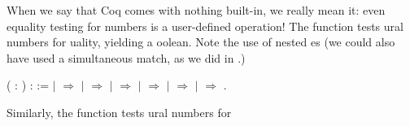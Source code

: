 \documentclass[12pt]{report}
\begin{document}
 When we say that Coq comes with nothing built-in, we really
    mean it: even equality testing for numbers is a user-defined
    operation!  The  function tests ural numbers for uality,
    yielding a oolean.  Note the use of nested es (we could
    also have used a simultaneous match, as we did in .)  \begin{coqdoccode}
\coqdocemptyline
\coqdocnoindent
{}  (  : ) :  :=\coqdoceol
\coqdocindent{1.00em}
  \coqdoceol
\coqdocindent{1.00em}
\ensuremath{|}  \ensuremath{\Rightarrow}   \coqdoceol
\coqdocindent{4.50em}
\ensuremath{|}  \ensuremath{\Rightarrow} \coqdoceol
\coqdocindent{4.50em}
\ensuremath{|}   \ensuremath{\Rightarrow} \coqdoceol
\coqdocindent{4.50em}
\coqdoceol
\coqdocindent{1.00em}
\ensuremath{|}   \ensuremath{\Rightarrow}   \coqdoceol
\coqdocindent{6.00em}
\ensuremath{|}  \ensuremath{\Rightarrow} \coqdoceol
\coqdocindent{6.00em}
\ensuremath{|}   \ensuremath{\Rightarrow}   \coqdoceol
\coqdocindent{6.00em}
\coqdoceol
\coqdocindent{1.00em}
.\coqdoceol
\coqdocemptyline
\end{coqdoccode}
Similarly, the  function tests ural numbers for
\end{document}
